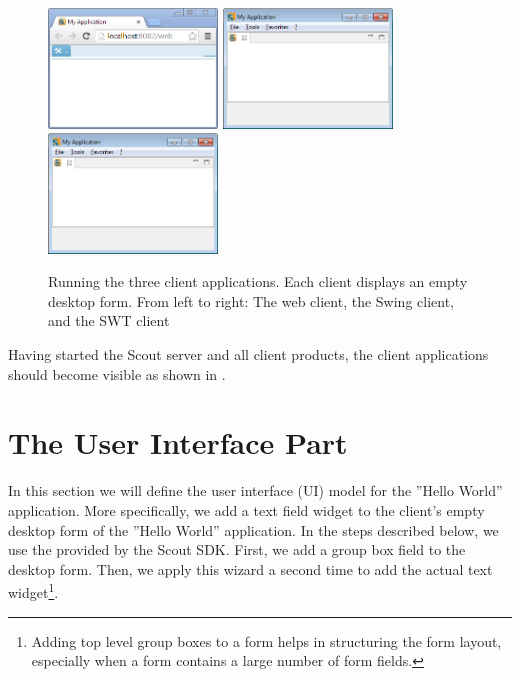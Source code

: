 \documentclass[a4paper,10pt,twoside]{book}
\begin{document}
\begin{figure}
\includegraphics[width=4.5cm]{hellworld_empty_rap.png} \hspace{3mm}
\includegraphics[width=4.5cm]{hellworld_empty_swing.png} \hspace{3mm}
\includegraphics[width=4.5cm]{hellworld_empty_swt.png}
\caption{Running the three client applications. 
Each client displays an empty desktop form. 
From left to right: The web client, the Swing client, and the SWT client}
\end{figure}

Having started the Scout server and all client products, the client applications should become visible as shown in .

\section{The User Interface Part}

In this section we will define the user interface (UI) model for the ''Hello World'' application.
More specifically, we add a text field widget to the client's empty desktop form of the ''Hello World'' application.
In the steps described below, we use the  provided by the Scout SDK. 
First, we add a group box field to the desktop form.
Then, we apply this wizard a second time to add the actual text widget\footnote{
Adding top level group boxes to a form helps in structuring the form layout, especially when a form contains a large number of form fields.
}.
\end{document}
